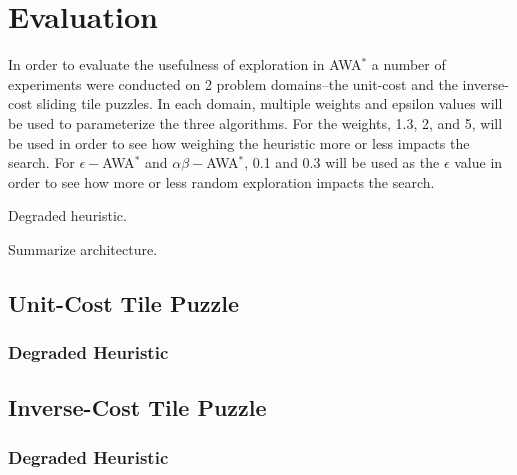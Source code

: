 \section{Evaluation}
In order to evaluate the usefulness of exploration in AWA$^*$ a number of experiments were conducted on 2 problem domains--the unit-cost and the inverse-cost sliding tile puzzles. In each domain, multiple weights and epsilon values will be used to parameterize the three algorithms. For the weights, 1.3, 2, and 5, will be used in order to see how weighing the heuristic more or less impacts the search. For $\epsilon-$AWA$^*$ and $\alpha \beta-$AWA$^*$, 0.1 and 0.3 will be used as the $\epsilon$ value in order to see how more or less random exploration impacts the search. 

Degraded heuristic.

Summarize architecture.

\subsection{Unit-Cost Tile Puzzle}

\subsubsection{Degraded Heuristic}


\subsection{Inverse-Cost Tile Puzzle}


\subsubsection{Degraded Heuristic}